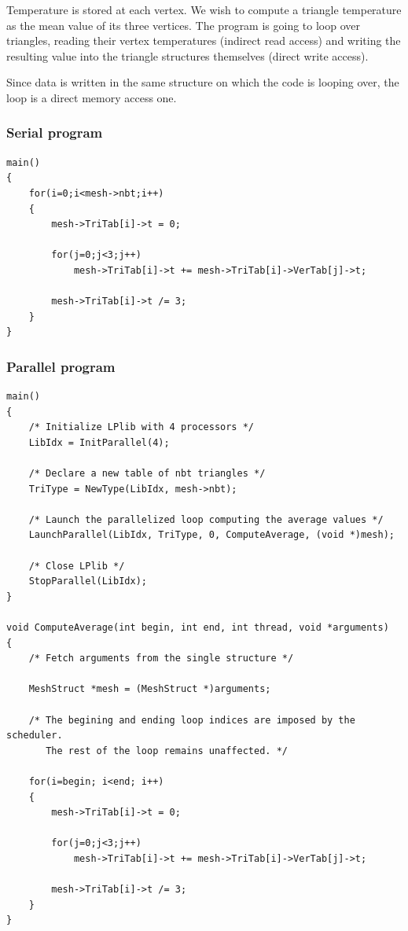 \documentclass[a4paper,12pt]{article}
\begin{document}
Temperature is stored at each vertex. We wish to compute a triangle temperature as the mean value of its three vertices. The program is going to loop over triangles, reading their vertex temperatures (indirect read access) and writing the resulting value into the triangle structures themselves (direct write access).

Since data is written in the same structure on which the code is looping over, the loop is a direct memory access one.

\subsubsection{Serial program}

\begin{tt}
\begin{verbatim}
main()
{
    for(i=0;i<mesh->nbt;i++)
    {
        mesh->TriTab[i]->t = 0;

        for(j=0;j<3;j++)
            mesh->TriTab[i]->t += mesh->TriTab[i]->VerTab[j]->t;

        mesh->TriTab[i]->t /= 3;
    }
}
\end{verbatim}
\end{tt}
\normalfont

\subsubsection{Parallel program}

\begin{tt}
\begin{verbatim}
main()
{
    /* Initialize LPlib with 4 processors */
    LibIdx = InitParallel(4);

    /* Declare a new table of nbt triangles */
    TriType = NewType(LibIdx, mesh->nbt);

    /* Launch the parallelized loop computing the average values */
    LaunchParallel(LibIdx, TriType, 0, ComputeAverage, (void *)mesh);

    /* Close LPlib */
    StopParallel(LibIdx);
}

void ComputeAverage(int begin, int end, int thread, void *arguments)
{
    /* Fetch arguments from the single structure */

    MeshStruct *mesh = (MeshStruct *)arguments;

    /* The begining and ending loop indices are imposed by the scheduler.
       The rest of the loop remains unaffected. */

    for(i=begin; i<end; i++)
    {
        mesh->TriTab[i]->t = 0;

        for(j=0;j<3;j++)
            mesh->TriTab[i]->t += mesh->TriTab[i]->VerTab[j]->t;

        mesh->TriTab[i]->t /= 3;
    }
}
\end{verbatim}
\end{tt}
\normalfont
\end{document}
